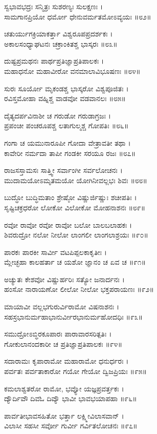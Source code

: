 ಸ್ವಭಾವಭದ್ರಃ ಸನ್ಮಿತ್ರಃ ಸುಶರಣ್ಯಃ ಸುಲಕ್ಷಣಃ ।\\
ಸಾಮಗಾನಪ್ರಿಯೋ ಧರ್ಮೋ ಧೇನುವರ್ಮತಮೋಽವ್ಯಯಃ ॥೮೨॥

ಚತುರ್ಯುಗಕ್ರಿಯಾಕರ್ತ್ತಾ ವಿಶ್ವರೂಪಪ್ರದರ್ಶಕಃ ।\\
ಅಕಾಲಸಂಧ್ಯಾಘಟನಃ ಚಕ್ರಾಂಕಿತಶ್ಚ ಭಾಸ್ಕರಃ ॥೮೩॥

ದುಷ್ಟಪ್ರಮಥನಃ ಪಾರ್ಥಪ್ರತಿಜ್ಞಾಪ್ರತಿಪಾಲಕಃ ।\\
ಮಹಾಧನೋ ಮಹಾವೀರೋ ವನಮಾಲಾವಿಭೂಷಣಃ ॥೮೪॥

ಸುರಃ ಸೂರ್ಯೋ ಮೃಕಂಡಶ್ಚ ಭಾಸ್ಕರೋ ವಿಶ್ವಪೂಜಿತಃ ।\\
ರವಿಸ್ತಮೋಹಾ ವಹ್ನಿಶ್ಚ ವಾಡವೋ ವಡವಾನಲಃ ॥೮೫॥

ದೈತ್ಯದರ್ಪವಿನಾಶೀ ಚ ಗರುಡೋ ಗರುಡಾಗ್ರಜಃ ।\\
ಪ್ರಪಂಚೀ ಪಂಚರೂಪಶ್ಚ ಲತಾಗುಲ್ಮಶ್ಚ ಗೋಪತಿಃ ॥೮೬॥

ಗಂಗಾ ಚ ಯಮುನಾರೂಪೀ ಗೋದಾ ವೇತ್ರಾವತೀ ತಥಾ ।\\
ಕಾವೇರೀ ನರ್ಮದಾ ತಾಪೀ ಗಂಡಕೀ ಸರಯೂ ರಜಃ ॥೮೭॥

ರಾಜಸಸ್ತಾಮಸಃ ಸಾತ್ತ್ವೀ ಸರ್ವಾಂಗೀ ಸರ್ವಲೋಚನಃ ।\\
ಮುದಾಮಯೋಽಮೃತಮಯೋ ಯೋಗಿನೀವಲ್ಲಭಃ ಶಿವಃ ॥೮೮॥

ಬುದ್ಧೋ ಬುದ್ಧಿಮತಾಂ ಶ್ರೇಷ್ಠೋ ವಿಷ್ಣುರ್ಜಿಷ್ಣುಃ ಶಚೀಪತಿಃ ।\\
ಸೃಷ್ಟಿಚಕ್ರಧರೋ ಲೋಕೋ ವಿಲೋಕೋ ಮೋಹನಾಶನಃ ॥೮೯॥

ರವೋ ರಾವೋ ರವೋ ರಾವೋ ಬಲೋ ಬಾಲಬಲಾಹಕಃ ।\\
ಶಿವರುದ್ರೋ ನಲೋ ನೀಲೋ ಲಾಂಗಲೀ ಲಾಂಗಲಾಶ್ರಯಃ ॥೯೦॥

ಪಾರಕಃ ಪಾರಕೀ ಸಾರ್ವೀ ವಟಪಿಪ್ಪಲಕಾಕೃತೀಃ ।\\
ಮ್ಲೇಚ್ಛಹಾ ಕಾಲಹರ್ತಾ ಚ ಯಶೋ ಜ್ಞಾನಂ ಚ ಏವ ಚ ॥೯೧॥

ಅಚ್ಯುತಃ ಕೇಶವೋ ವಿಷ್ಣುರ್ಹರಿಃ ಸತ್ಯೋ ಜನಾರ್ದನಃ ।\\
ಹಂಸೋ ನಾರಾಯಣೋ ಲೀಲೋ ನೀಲೋ ಭಕ್ತಪರಾಯಣಃ ॥೯೨॥

ಮಾಯಾವೀ ವಲ್ಲಭಗುರುರ್ವಿರಾಮೋ ವಿಷನಾಶನಃ ।\\
ಸಹಸ್ರಭಾನುರ್ಮಹಾಭಾನುರ್ವೀರಭಾನುರ್ಮಹೋದಧಿಃ ॥೯೩॥

ಸಮುದ್ರೋಽಬ್ಧಿರಕೂಪಾರಃ ಪಾರಾವಾರಸರಿತ್ಪತಿಃ ।\\
ಗೋಕುಲಾನಂದಕಾರೀ ಚ ಪ್ರತಿಜ್ಞಾಪ್ರತಿಪಾಲಕಃ ॥೯೪॥

ಸದಾರಾಮಃ ಕೃಪಾರಾಮೋ ಮಹಾರಾಮೋ ಧನುರ್ಧರಃ ।\\
ಪರ್ವತಃ ಪರ್ವತಾಕಾರೋ ಗಯೋ ಗೇಯೋ ದ್ವಿಜಪ್ರಿಯಃ ॥೯೫॥

ಕಮಲಾಶ್ವತರೋ ರಾಮೋ, ಭವ್ಯೋ ಯಜ್ಞಪ್ರವರ್ತ್ತಕಃ ।\\
ದ್ಯೌರ್ದಿವೌ ದಿವಓ ದಿವ್ಯೌ ಭಾವೀ ಭಾವಭಯಾಪಹಾ ॥೯೬॥

ಪಾರ್ವತೀಭಾವಸಹಿತೋ ಭರ್ತ್ತಾ ಲಕ್ಷ್ಮೀವಿಲಾಸವಾನ್ ।\\
ವಿಲಾಸೀ ಸಹಸೀ ಸರ್ವೋ ಗುರ್ವೀ ಗರ್ವಿತಲೋಚನಃ ॥೯೭॥

